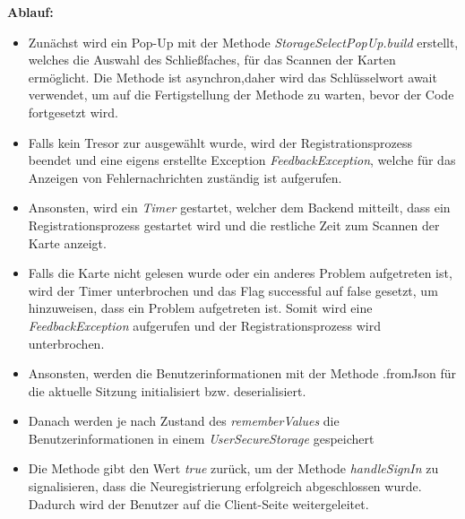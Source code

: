 {{{\textbf{Ablauf:}}
\begin{itemize}
    \item Zun\"achst wird ein Pop-Up mit der Methode {\textit{StorageSelectPopUp.build}} erstellt, welches die Auswahl des Schließfaches, für das Scannen der Karten erm\"oglicht. Die Methode ist asynchron,daher wird das Schlüsselwort await verwendet, um auf die Fertigstellung der Methode zu warten, bevor der Code fortgesetzt wird.
    \item Falls kein Tresor zur ausgew\"ahlt wurde, wird der Registrationsprozess beendet und eine eigens erstellte Exception {\textit{FeedbackException}}, welche für das Anzeigen von Fehlernachrichten  zuständig ist aufgerufen.
    \item Ansonsten, wird ein {\textit{Timer}} gestartet, welcher dem Backend mitteilt, dass ein Registrationsprozess gestartet wird und die restliche Zeit zum Scannen der Karte anzeigt.
    \item Falls die Karte nicht gelesen wurde oder ein anderes Problem aufgetreten ist, wird der Timer unterbrochen und das Flag {successful} auf false gesetzt, um hinzuweisen, dass ein Problem aufgetreten ist. Somit wird eine {\textit{FeedbackException}} aufgerufen und der Registrationsprozess wird unterbrochen.
    \item Ansonsten, werden die Benutzerinformationen mit der Methode {\textit{}{.fromJson}} für die aktuelle Sitzung initialisiert bzw. deserialisiert.
    \item Danach werden je nach Zustand des {\textit{rememberValues}} die Benutzerinformationen in einem {\textit{UserSecureStorage}} gespeichert
    \item Die Methode gibt den Wert {\textit{true}} zurück, um der Methode {\textit{handleSignIn}} zu signalisieren, dass die Neuregistrierung erfolgreich abgeschlossen wurde. Dadurch wird der Benutzer auf die Client-Seite weitergeleitet.
\end{itemize}
\newpage
}}
